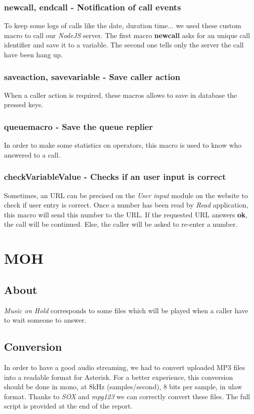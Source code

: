 \subsubsection{newcall, endcall - Notification of call events}
To keep some logs of calls like the date, duration time... we used these custom macro to call our \textit{NodeJS} server.
The first macro \textbf{newcall} asks for an unique call identifier and save it to a variable. 
The second one tells only the server the call have been hang up.

\subsubsection{saveaction, savevariable - Save caller action}
When a caller action is required, these macros allows to save in database the pressed keys.

\subsubsection{queuemacro - Save the queue replier}
In order to make some statistics on operators, this macro is used to know who answered to a call.

\subsubsection{checkVariableValue - Checks if an user input is correct}
Sometimes, an URL can be precised on the \textit{User input} module on the website to check if user entry is correct. Once a number has been read by \textit{Read} application, this macro will send this number to the URL. If the requested URL answers \textbf{ok}, the call will be continued. Else, the caller will be asked to re-enter a number.




\section{MOH}
\subsection{About}
\textit{Music on Hold} corresponds to some files which will be played when a caller have to wait someone to answer.  

\subsection{Conversion}
In order to have a good audio streaming, we had to convert uploaded MP3 files into a readable format for Asterisk. For a better experience, this conversion should be done in mono, at 8kHz (samples/second), 8 bits per sample, in ulaw format. Thanks to \textit{SOX} and \textit{mpg123} we can correctly convert these files.	
The full script is provided at the end of the report.





